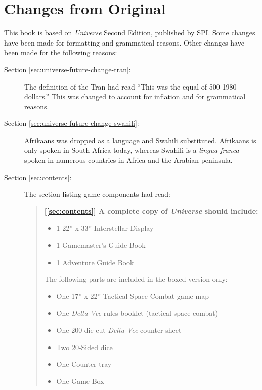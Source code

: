 \chapter{Changes from Original}
\label{cha:changes-from-original}

This book is based on \emph{Universe} Second Edition, published by
SPI.  Some changes have been made for formatting and grammatical
reasons.  Other changes have been made for the following reasons:


\begin{description}
\item[Section \ref{sec:universe-future-change-tran}:] The definition
  of the Tran had read ``This was the equal of 500 1980 dollars.''
  This was changed to account for inflation and for grammatical
  reasons.
\item[Section \ref{sec:universe-future-change-swahili}:] Afrikaans was
  dropped as a language and Swahili substituted. Afrikaans is only
  spoken in South Africa today, whereas Swahili is a \emph{lingua
    franca} spoken in numerous countries in Africa and the Arabian
  peninsula.
\item[Section \ref{sec:contents}:] The section listing game
  components had read:
  
  \begin{quote}
    {\normalfont\bfseries [\ref{sec:contents}] A complete copy
      of \emph{Universe} should include:}
    
    \begin{itemize}
    \item 1 22'' x 33'' Interstellar Display
    \item 1 Gamemaster's Guide Book
    \item 1 Adventure Guide Book
    \end{itemize}
    
    The following parts are included in the boxed version only:
    
    \begin{itemize}
    \item One 17'' x 22'' Tactical Space Combat game map
    \item One \emph{Delta Vee} rules booklet (tactical space combat)
    \item One 200 die-cut \emph{Delta Vee} counter sheet
    \item Two 20-Sided dice
    \item One Counter tray
    \item One Game Box
    \end{itemize}
  \end{quote}


\end{description}
